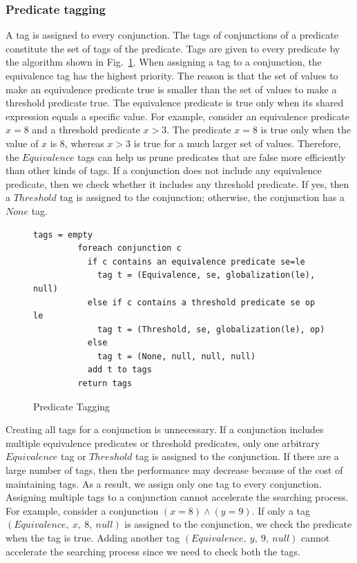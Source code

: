\documentclass[preprint]{sigplanconf}
\begin{document}
\subsubsection{Predicate tagging}
A tag is assigned to every conjunction. The tags of 
conjunctions of a predicate constitute the set of tags of the predicate. 
Tags are given to every predicate by the algorithm shown in
Fig.~\ref{fig:tagging}. 
When assigning a tag to a conjunction, the equivalence tag has the highest 
priority. The reason is that the set of values to make an equivalence predicate
true is smaller than the set of values to make a threshold predicate true. The equivalence predicate is true 
only when its shared expression equals a specific value. 
For example, consider an equivalence 
predicate $x = 8$ and a threshold predicate $x > 3$. The predicate $x = 8$ is true only when 
the value of $x$ is $8$, whereas $x > 3$ is true for a much larger set of values.
Therefore, the $Equivalence$ tags can help us prune
predicates that are false more efficiently than other kinds of
tags. 
If a conjunction does not 
include any equivalence predicate, then we check whether it 
includes any threshold predicate. If yes, then a $Threshold$ tag is assigned 
to the conjunction; otherwise, the conjunction has a $None$ tag. 

\begin{figure}[ht!]
    \begin{Verbatim}[fontsize=\footnotesize,gobble=8,frame=lines,
            framesep=3mm]
         tags = empty
         foreach conjunction c 
           if c contains an equivalence predicate se=le
             tag t = (Equivalence, se, globalization(le), null)
           else if c contains a threshold predicate se op le
             tag t = (Threshold, se, globalization(le), op)
           else 
             tag t = (None, null, null, null) 
           add t to tags 
         return tags
    \end{Verbatim}
  \caption{Predicate Tagging}
  \label{fig:tagging}
\end{figure}
Creating all tags for a conjunction is unnecessary. If a conjunction includes 
multiple equivalence predicates or threshold predicates, only one arbitrary 
$Equivalence$ tag or $Threshold$ tag is assigned to the conjunction. 
If there are a large number of tags, then the performance may decrease
because of the cost of maintaining tags. As a result, we assign only one tag to
every conjunction.
Assigning multiple tags to a 
conjunction cannot accelerate the searching process. For example, consider a 
conjunction $(x = 8) \wedge (y = 9)$. If only a tag 
$(Equivalence,\ x,\ 8,\ null)$
is assigned to the conjunction, we check the predicate when the tag is
true. Adding another tag $(Equivalence,\ y,\ 9,\ null)$ cannot accelerate the
searching process since we need to check both the tags. 
 
\end{document}
